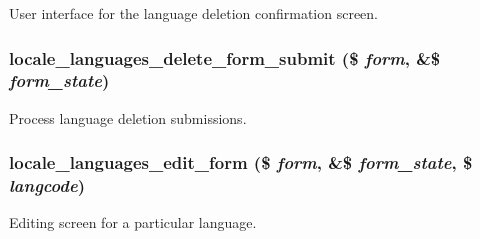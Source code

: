 \label{group__locale_gae91146ea73b4fde0a5584e4a9e502903}
User interface for the language deletion confirmation screen. \hypertarget{group__locale_gadbf1eb80de38d65bda55e63699822e3c}{
\subsubsection[{locale\_\-languages\_\-delete\_\-form\_\-submit}]{\setlength{\rightskip}{0pt plus 5cm}locale\_\-languages\_\-delete\_\-form\_\-submit (\$ {\em form}, \/  \&\$ {\em form\_\-state})}}
\label{group__locale_gadbf1eb80de38d65bda55e63699822e3c}
Process language deletion submissions. \hypertarget{group__locale_ga32b1bc378b3343f57cf3632acd8701f6}{
\subsubsection[{locale\_\-languages\_\-edit\_\-form}]{\setlength{\rightskip}{0pt plus 5cm}locale\_\-languages\_\-edit\_\-form (\$ {\em form}, \/  \&\$ {\em form\_\-state}, \/  \$ {\em langcode})}}
\label{group__locale_ga32b1bc378b3343f57cf3632acd8701f6}
Editing screen for a particular language.


